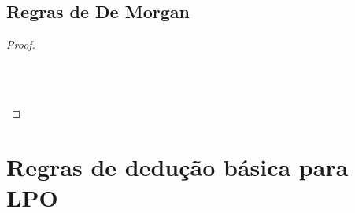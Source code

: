 \begin{multicols}{2}
\subsection*{Regras de De Morgan}
\begin{proof}

\\	

\\	

\\	
\end{proof}
\end{multicols}

\newpage

\section{Regras de dedução básica para LPO}

